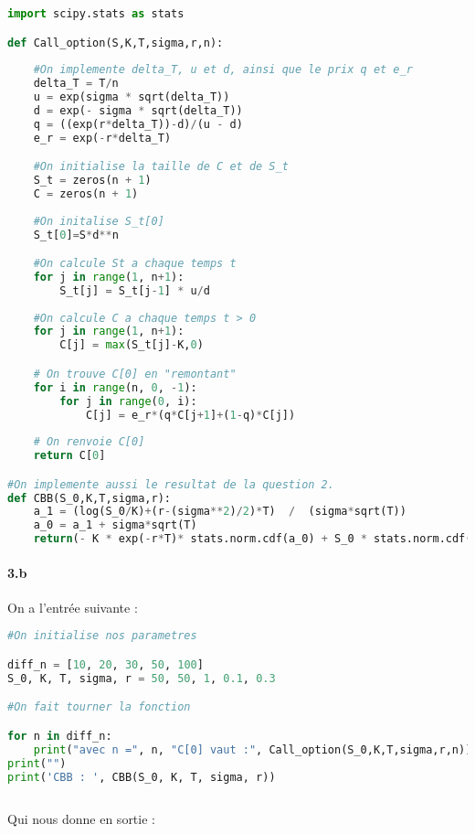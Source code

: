 \documentclass[a4paper,10pt]{report}
\begin{document}
\begin{lstlisting}[language=Python]
%pylab inline
import scipy.stats as stats

def Call_option(S,K,T,sigma,r,n):
    
    #On implemente delta_T, u et d, ainsi que le prix q et e_r
    delta_T = T/n
    u = exp(sigma * sqrt(delta_T))
    d = exp(- sigma * sqrt(delta_T))
    q = ((exp(r*delta_T))-d)/(u - d)
    e_r = exp(-r*delta_T)

    #On initialise la taille de C et de S_t
    S_t = zeros(n + 1)
    C = zeros(n + 1)
    
    #On initalise S_t[0]
    S_t[0]=S*d**n

    #On calcule St a chaque temps t
    for j in range(1, n+1): 
        S_t[j] = S_t[j-1] * u/d
    
    #On calcule C a chaque temps t > 0
    for j in range(1, n+1):
        C[j] = max(S_t[j]-K,0)

    # On trouve C[0] en "remontant"
    for i in range(n, 0, -1):
        for j in range(0, i):
            C[j] = e_r*(q*C[j+1]+(1-q)*C[j])
            
    # On renvoie C[0]        
    return C[0]

#On implemente aussi le resultat de la question 2.
def CBB(S_0,K,T,sigma,r):
    a_1 = (log(S_0/K)+(r-(sigma**2)/2)*T)  /  (sigma*sqrt(T))  
    a_0 = a_1 + sigma*sqrt(T)
    return(- K * exp(-r*T)* stats.norm.cdf(a_0) + S_0 * stats.norm.cdf(a_1))

\end{lstlisting}


\paragraph*{3.b} On a l'entrée suivante :

\begin{lstlisting}[language=Python]
#On initialise nos parametres

diff_n = [10, 20, 30, 50, 100]
S_0, K, T, sigma, r = 50, 50, 1, 0.1, 0.3

#On fait tourner la fonction

for n in diff_n:
    print("avec n =", n, "C[0] vaut :", Call_option(S_0,K,T,sigma,r,n))
print("")
print('CBB : ', CBB(S_0, K, T, sigma, r))
    
\end{lstlisting}

Qui nous donne en sortie :
\end{document}
